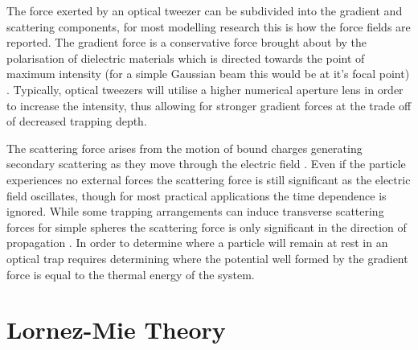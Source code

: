 The force exerted by an optical tweezer can be subdivided into 
the gradient and scattering components, for most modelling 
research this is how the force fields are reported. The gradient 
force is a conservative force brought about by the polarisation 
of dielectric materials which is directed towards the point of 
maximum intensity (for a simple Gaussian beam this would be at 
it's focal point) \cite{YasuhiroHarada1996}. Typically, optical 
tweezers will utilise a higher numerical aperture lens in order 
to increase the intensity, thus allowing for stronger gradient 
forces at the trade off of decreased trapping depth.

The scattering force arises from the motion of bound charges 
generating secondary scattering as they move through the 
electric field \cite{YasuhiroHarada1996}. Even if the particle
experiences no external forces the scattering force is still 
significant as the electric field oscillates, though for most
practical applications the time dependence is ignored. While 
some trapping arrangements can induce transverse scattering 
forces for simple spheres the scattering force is only 
significant in the direction of propagation \cite{Capitanio2002}.
In order to determine where a particle will remain at rest 
in an optical trap requires determining where the potential 
well formed by the gradient force is equal to the thermal 
energy of the system. 

\section{Lornez-Mie Theory}

